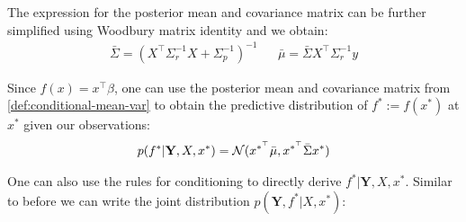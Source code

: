 The expression for the posterior mean and covariance matrix can be further simplified using Woodbury matrix identity
and we obtain:
\begin{align}\label{def:conditional-mean-var}
    \bar{\Sigma} = (X^{\top}\Sigma_r^{-1}X + \Sigma_p^{-1})^{-1} & & \bar{\mu} = \bar{\Sigma} X^{\top} \Sigma_r^{-1} y
\end{align}

Since $f(x) = x^{\top}\beta$, one can use the posterior mean and covariance matrix from
\ref{def:conditional-mean-var} to obtain the predictive distribution of $f^{\ast} := f(x^{\ast})$ at $x^{\ast}$
given our observations:
\begin{align}\label{def:predictive-dist}
    p(f^{\ast} | \mathbf{Y}, X, x^{\ast}) = \operatorname{\mathcal{N}}(x^{\ast^{\top}} \bar{\mu}, x^{\ast^{\top}} \bar{\Sigma} x^{\ast})
\end{align}

One can also use the rules for conditioning to directly derive $f^{\ast} | \mathbf{Y}, X, x^{\ast}$.
Similar to before we can write the joint distribution $p(\mathbf{Y}, f^{\ast}| X, x^{\ast})$:

